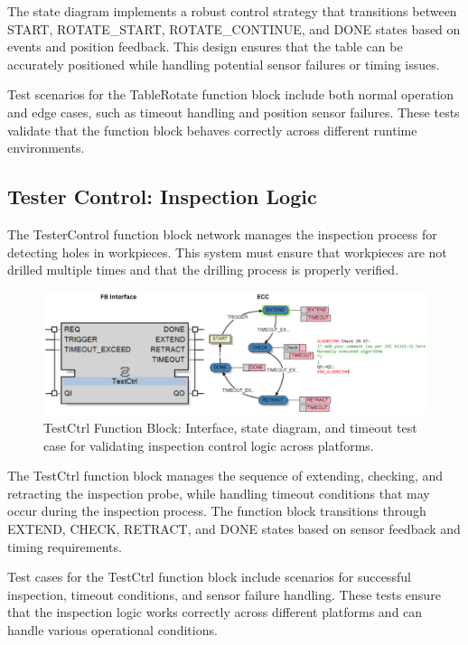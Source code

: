 The state diagram implements a robust control strategy that transitions between START, ROTATE\_START, ROTATE\_CONTINUE, and DONE states based on events and position feedback. This design ensures that the table can be accurately positioned while handling potential sensor failures or timing issues.

Test scenarios for the TableRotate function block include both normal operation and edge cases, such as timeout handling and position sensor failures. These tests validate that the function block behaves correctly across different runtime environments.

\subsection{Tester Control: Inspection Logic}

The TesterControl function block network manages the inspection process for detecting holes in workpieces. This system must ensure that workpieces are not drilled multiple times and that the drilling process is properly verified.

\begin{figure}[!htbp]
    \centering
    \includegraphics[width=0.99\linewidth]{MX_Papers/Paper10/Figures/TestCtrl.png}
    \caption{TestCtrl Function Block: Interface, state diagram, and timeout test case for validating inspection control logic across platforms.}
    \label{fig:test_ctrl}
\end{figure}

The TestCtrl function block manages the sequence of extending, checking, and retracting the inspection probe, while handling timeout conditions that may occur during the inspection process. The function block transitions through EXTEND, CHECK, RETRACT, and DONE states based on sensor feedback and timing requirements.

Test cases for the TestCtrl function block include scenarios for successful inspection, timeout conditions, and sensor failure handling. These tests ensure that the inspection logic works correctly across different platforms and can handle various operational conditions.

